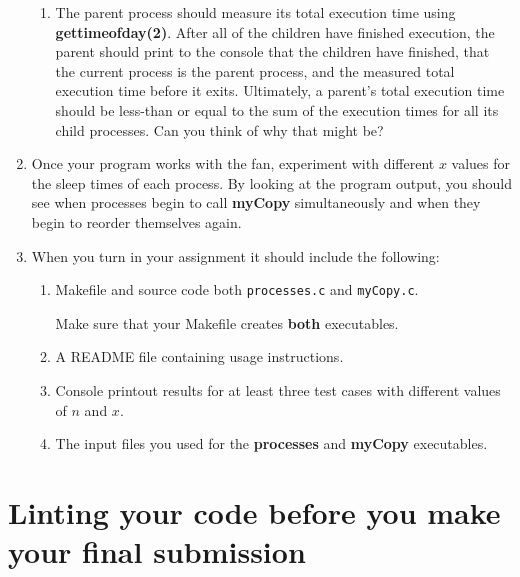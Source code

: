 \documentclass[12pt]{article}
\begin{document}
\begin{enumerate}
\begin{enumerate}
    \item The parent process should measure its total execution time
    using \textbf{gettimeofday(2)}.  After all of the children
    have finished execution, the parent should print to the console
    that the children have finished, that the current process is the
    parent process, and the measured total execution time before
    it exits.  Ultimately, a parent's total execution time should be
    less-than or equal to the sum of the execution times for all its
    child processes.  Can you think of why that might be?
  \end{enumerate}

  \item Once your program works with the fan, experiment with
  different $x$ values for the sleep times of each process.  By
  looking at the program output, you should see when processes begin to
  call \textbf{myCopy} simultaneously and when they begin to reorder themselves
  again.

  \item When you turn in your assignment it should include
  the following:
  \begin{enumerate}
    \item Makefile and source code both \texttt{processes.c} and
    \texttt{myCopy.c}. 

    Make sure that your Makefile creates \textbf{both} executables.

    \item A README file containing usage instructions.

    \item Console printout results for at least three test cases with
    different values of $n$ and $x$.

    \item The input files you used for the \textbf{processes} and
    \textbf{myCopy} executables.
  \end{enumerate}
\end{enumerate}

\section{Linting your code before you make your final submission}
\end{document}
